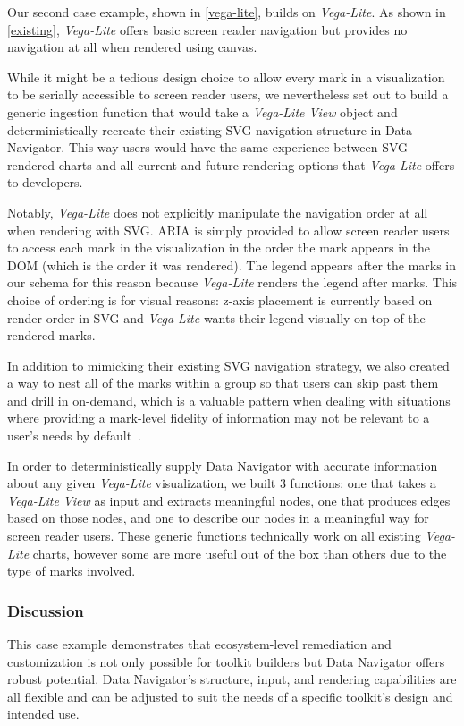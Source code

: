 \documentclass[journal]{vgtc}                %
\begin{document}
Our second case example, shown in \autoref{vega-lite}, builds on \textit{Vega-Lite}. As shown in \autoref{existing}, \textit{Vega-Lite} offers basic screen reader navigation but provides no navigation at all when rendered using canvas.

While it might be a tedious design choice to allow every mark in a visualization to be serially accessible to screen reader users, we nevertheless set out to build a generic ingestion function that would take a \textit{Vega-Lite View} object and deterministically recreate their existing SVG navigation structure in Data Navigator. This way users would have the same experience between SVG rendered charts and all current and future rendering options that \textit{Vega-Lite} offers to developers. 

Notably, \textit{Vega-Lite} does not explicitly manipulate the navigation order at all when rendering with SVG. ARIA is simply provided to allow screen reader users to access each mark in the visualization in the order the mark appears in the DOM (which is the order it was rendered). The legend appears after the marks in our schema for this reason because \textit{Vega-Lite} renders the legend after marks. This choice of ordering is for visual reasons: z-axis placement is currently based on render order in SVG and \textit{Vega-Lite} wants their legend visually on top of the rendered marks.

In addition to mimicking their existing SVG navigation strategy, we also created a way to nest all of the marks within a group so that users can skip past them and drill in on-demand, which is a valuable pattern when dealing with situations where providing a mark-level fidelity of information may not be relevant to a user's needs by default~\cite{Shneiderman2003Eyes,Zong2022Rich}.

In order to deterministically supply Data Navigator with accurate information about any given \textit{Vega-Lite} visualization, we built 3 functions: one that takes a \textit{Vega-Lite View} as input and extracts meaningful nodes, one that produces edges based on those nodes, and one to describe our nodes in a meaningful way for screen reader users. These generic functions technically work on all existing \textit{Vega-Lite} charts, however some are more useful out of the box than others due to the type of marks involved.

\subsubsection{Discussion}
This case example demonstrates that ecosystem-level remediation and customization is not only possible for toolkit builders but Data Navigator offers robust potential. Data Navigator's structure, input, and rendering capabilities are all flexible and can be adjusted to suit the needs of a specific toolkit's design  and intended use.
\end{document}
